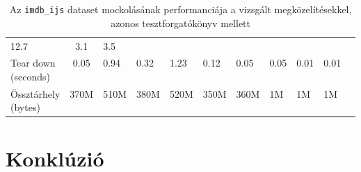 \documentclass[
    parspace, %
    noindent, %
]{elteiktdk}[2023/10/30]
\newcommand{\guessvalue}{}
\newcommand{\rhpad}{\vspace{0.6\baselineskip}}
\begin{document}
\begin{table}
\begin{tabularx}{\textwidth}{l| c *{8}{|Y} c}
    12.7\guessvalue & %
    3.1\guessvalue & %
    3.5\guessvalue \\ %
  \parbox{2cm}{\rhpad Tear down \\ (seconds) \rhpad} &
    0.05\guessvalue & %
    0.94\guessvalue & %
    0.32\guessvalue & %
    1.23\guessvalue & %
    0.12\guessvalue & %
    0.05\guessvalue & %
    0.05\guessvalue & %
    0.01\guessvalue & %
    0.01\guessvalue \\ %
  \parbox{2cm}{\rhpad Össztárhely \\ (bytes) \rhpad} &
    370M\guessvalue & %
    510M\guessvalue & %
    380M\guessvalue & %
    520M\guessvalue & %
    350M\guessvalue & %
    360M\guessvalue & %
    1M\guessvalue & %
    1M\guessvalue & %
    1M\guessvalue \\ %
    
    
  \bottomrule
\end{tabularx}
\caption{Az \texttt{imdb\_ijs} dataset mockolásának performanciája a vizsgált megközelítésekkel, azonos tesztforgatókönyv mellett}
\label{tab:comp_table}
\end{table}


\chapter{Konklúzió}

\end{document}
